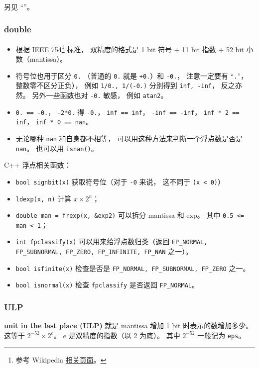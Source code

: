 
\begin{issues}
\issueDraft
\end{issues}

另见 “”。

\subsubsection{double}
\begin{itemize}
\item 根据 IEEE 754\footnote{参考 Wikipedia \href{https://en.wikipedia.org/wiki/IEEE_754}{相关页面}。} 标准， 双精度的格式是 1 bit 符号 + 11 bit 指数 + 52 bit 小数（mantissa）。
\item 符号位也用于区分 \verb`0.` （普通的 \verb`0.` 就是 \verb`+0.`）和 \verb`-0.`， 注意一定要有 “\verb`.`”， 整数零不区分正负）， 例如 \verb`1/0., 1/(-0.)` 分别得到 \verb`inf, -inf`， 反之亦然。 另外一些函数也对 \verb`-0.` 敏感， 例如 \verb`atan2`。
\item \verb`0. == -0.`， \verb`-2*0.` 得 \verb`-0.`， \verb`inf == inf`， \verb`-inf == -inf`， \verb`inf * 2 == inf`， \verb`inf * 0 == nan`。
\item 无论哪种 \verb`nan` 和自身都不相等， 可以用这种方法来判断一个浮点数是否是 \verb`nan`。 也可以用 \verb`isnan()`。
\end{itemize}

C++ 浮点相关函数：
\begin{itemize}
\item \verb`bool signbit(x)` 获取符号位（对于 \verb`-0` 来说， 这不同于 \verb`(x < 0)`）
\item \verb`ldexp(x, n)` 计算 $x \times 2^n$； 
\item \verb`double man = frexp(x, &exp2)` 可以拆分 mantissa 和 exp。 其中 \verb`0.5 <= man < 1`； 
\item \verb`int fpclassify(x)` 可以用来给浮点数归类（返回 \verb`FP_NORMAL, FP_SUBNORMAL, FP_ZERO, FP_INFINITE, FP_NAN` 之一）。 
\item \verb`bool isfinite(x)` 检查是否是 \verb`FP_NORMAL, FP_SUBNORMAL, FP_ZERO` 之一。
\item \verb`bool isnormal(x)` 检查 \verb`fpclassify` 是否返回 \verb`FP_NORMAL`。 
\end{itemize}


\subsubsection{ULP}
\textbf{unit in the last place (ULP)} 就是 mantissa 增加 1 bit 时表示的数增加多少。 这等于 $2^{-52}\times 2^{e}$。 $e$ 是双精度的指数（以 2 为底）。 其中 $2^{-52}$ 一般记为 \verb`eps`。

